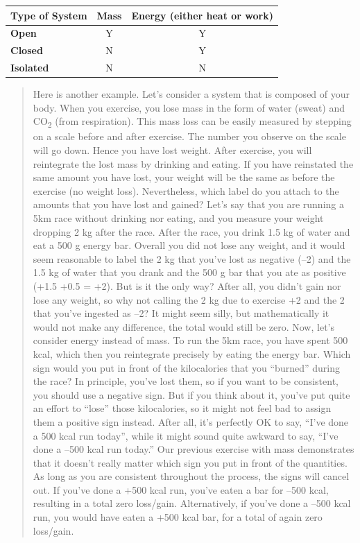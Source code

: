 \documentclass[
  9pt,
]{extbook}
\theoremstyle{definition}
\theoremstyle{definition}
\theoremstyle{definition}
\theoremstyle{remark}
\begin{document}
\begin{longtable}[]{@{}lcc@{}}
\toprule
\textbf{Type of System} & \textbf{Mass} & \textbf{Energy} (either heat or work)\tabularnewline
\midrule
\endhead
\textbf{Open} & Y & Y\tabularnewline
\textbf{Closed} & N & Y\tabularnewline
\textbf{Isolated} & N & N\tabularnewline
\bottomrule
\end{longtable}

\begin{quote}
Here is another example. Let's consider a system that is composed of your body. When you exercise, you lose mass in the form of water (sweat) and CO\textsubscript{2} (from respiration). This mass loss can be easily measured by stepping on a scale before and after exercise. The number you observe on the scale will go down. Hence you have lost weight. After exercise, you will reintegrate the lost mass by drinking and eating. If you have reinstated the same amount you have lost, your weight will be the same as before the exercise (no weight loss). Nevertheless, which label do you attach to the amounts that you have lost and gained? Let's say that you are running a 5km race without drinking nor eating, and you measure your weight dropping 2 kg after the race. After the race, you drink 1.5 kg of water and eat a 500 g energy bar. Overall you did not lose any weight, and it would seem reasonable to label the 2 kg that you've lost as negative (--2) and the 1.5 kg of water that you drank and the 500 g bar that you ate as positive (+1.5 +0.5 = +2). But is it the only way? After all, you didn't gain nor lose any weight, so why not calling the 2 kg due to exercise +2 and the 2 that you've ingested as --2? It might seem silly, but mathematically it would not make any difference, the total would still be zero. Now, let's consider energy instead of mass. To run the 5km race, you have spent 500 kcal, which then you reintegrate precisely by eating the energy bar. Which sign would you put in front of the kilocalories that you ``burned'' during the race? In principle, you've lost them, so if you want to be consistent, you should use a negative sign. But if you think about it, you've put quite an effort to ``lose'' those kilocalories, so it might not feel bad to assign them a positive sign instead. After all, it's perfectly OK to say, ``I've done a 500 kcal run today'', while it might sound quite awkward to say, ``I've done a --500 kcal run today.'' Our previous exercise with mass demonstrates that it doesn't really matter which sign you put in front of the quantities. As long as you are consistent throughout the process, the signs will cancel out. If you've done a +500 kcal run, you've eaten a bar for --500 kcal, resulting in a total zero loss/gain. Alternatively, if you've done a --500 kcal run, you would have eaten a +500 kcal bar, for a total of again zero loss/gain.
\end{quote}
\end{document}
